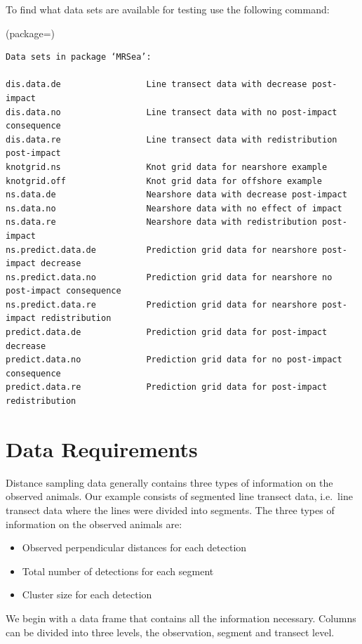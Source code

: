 To find what data sets are available for testing use the following command:\\
\begin{knitrout}\footnotesize
{}\color{fgcolor}
\begin{kframe}
(package=)
\end{kframe}
\begin{verbatim}
Data sets in package ‘MRSea’:

dis.data.de                 Line transect data with decrease post-impact
dis.data.no                 Line transect data with no post-impact consequence
dis.data.re                 Line transect data with redistribution post-impact
knotgrid.ns                 Knot grid data for nearshore example
knotgrid.off                Knot grid data for offshore example
ns.data.de                  Nearshore data with decrease post-impact
ns.data.no                  Nearshore data with no effect of impact
ns.data.re                  Nearshore data with redistribution post-impact
ns.predict.data.de          Prediction grid data for nearshore post-impact decrease
ns.predict.data.no          Prediction grid data for nearshore no post-impact consequence
ns.predict.data.re          Prediction grid data for nearshore post-impact redistribution
predict.data.de             Prediction grid data for post-impact decrease
predict.data.no             Prediction grid data for no post-impact consequence
predict.data.re             Prediction grid data for post-impact redistribution
\end{verbatim}
\end{knitrout}
\section{Data Requirements} 
Distance sampling data generally contains three types of information on the observed animals. Our example consists of segmented line transect data, i.e.\ line transect data where the lines were divided into segments.  The three types of information on the observed animals are: 
\begin{itemize}
\item Observed perpendicular distances for each detection
\item Total number of detections for each segment
\item Cluster size for each detection
\end{itemize}
We begin with a data frame that contains all the information necessary. Columns can be divided into three levels, the observation, segment and transect level. 
